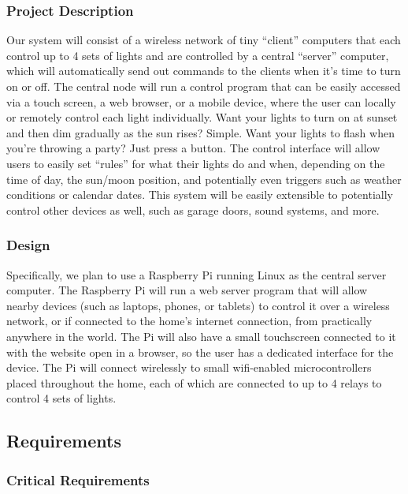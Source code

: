 \subsubsection{Project Description}

Our system will consist of a wireless network of tiny ``client'' computers that
each control up to 4 sets of lights and are controlled by a central ``server''
computer, which will automatically send out commands to the clients when it's
time to turn on or off.  The central node will run a control program that can
be easily accessed via a touch screen, a web browser, or a mobile device, where
the user can locally or remotely control each light individually.  Want your
lights to turn on at sunset and then dim gradually as the sun rises?  Simple.
Want your lights to flash when you're throwing a party?  Just press a button.
The control interface will allow users to easily set ``rules'' for what their
lights do and when, depending on the time of day, the sun/moon position, and
potentially even triggers such as weather conditions or calendar dates.  This
system will be easily extensible to potentially control other devices as well,
such as garage doors, sound systems, and more.

\subsubsection{Design}

Specifically, we plan to use a Raspberry Pi running Linux as the central server
computer.  The Raspberry Pi will run a web server program that will allow
nearby devices (such as laptops, phones, or tablets) to control it over a
wireless network, or if connected to the home's internet connection, from
practically anywhere in the world.  The Pi will also have a small touchscreen
connected to it with the website open in a browser, so the user has a dedicated
interface for the device.  The Pi will connect wirelessly to small wifi-enabled
microcontrollers placed throughout the home, each of which are connected to up
to 4 relays to control 4 sets of lights.

\subsection{Requirements}

\subsubsection{Critical Requirements}

